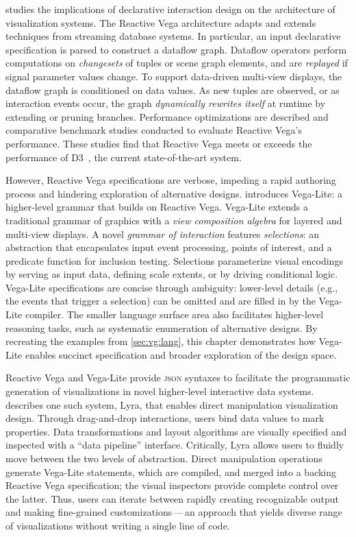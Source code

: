  studies the implications of declarative interaction design on
the architecture of visualization systems. The Reactive Vega architecture adapts
and extends techniques from streaming database systems. In particular, an input
declarative specification is parsed to construct a dataflow graph. Dataflow
operators perform computations on \emph{changesets} of tuples or scene graph
elements, and are \emph{replayed} if signal parameter values change. To support
data-driven multi-view displays, the dataflow graph is conditioned on data
values. As new tuples are observed, or as interaction events occur, the graph
\emph{dynamically rewrites itself} at runtime by extending or pruning branches.
Performance optimizations are described and comparative benchmark studies
conducted to evaluate Reactive Vega's performance. These studies find that
Reactive Vega meets or exceeds the performance of D3~\cite{bostock:d3}, the
current state-of-the-art system.

However, Reactive Vega specifications are verbose, impeding a rapid authoring
process and hindering exploration of alternative designs. 
introduces Vega-Lite: a higher-level grammar that builds on Reactive Vega.
Vega-Lite extends a traditional grammar of graphics with a \emph{view
composition algebra} for layered and multi-view displays. A novel \emph{grammar
of interaction} features \emph{selections}: an abstraction that encapsulates
input event processing, points of interest, and a predicate function for
inclusion testing. Selections parameterize visual encodings by serving as input
data, defining scale extents, or by driving conditional logic. Vega-Lite
specifications are concise through ambiguity: lower-level details (e.g., the
events that trigger a selection) can be omitted and are filled in by the
Vega-Lite compiler. The smaller language surface area also facilitates
higher-level reasoning tasks, such as systematic enumeration of alternative
designs. By recreating the examples from \cref{sec:vg:lang}, this chapter
demonstrates how Vega-Lite enables succinct specification and broader
exploration of the design space.

Reactive Vega and Vega-Lite provide \textsc{json} syntaxes to facilitate the
programmatic generation of visualizations in novel higher-level interactive data
systems.  describes one such system, Lyra, that enables direct
manipulation visualization design. Through drag-and-drop interactions, users
bind data values to mark properties. Data transformations and layout algorithms
are visually specified and inspected with a ``data pipeline'' interface.
Critically, Lyra allows users to fluidly move between the two levels of
abstraction. Direct manipulation operations generate Vega-Lite statements, which
are compiled, and merged into a backing Reactive Vega specification; the visual
inspectors provide complete control over the latter. Thus, users can iterate
between rapidly creating recognizable output and making fine-grained
customizations\,---\,an approach that yields diverse range of visualizations
without writing a single line of code.

